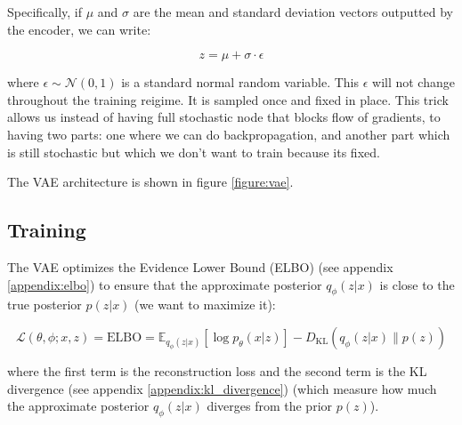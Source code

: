 Specifically, if $\mu$ and $\sigma$ are the mean and standard deviation vectors outputted by the encoder, we can write:

\begin{equation}
    z = \mu + \sigma \cdot \epsilon
\end{equation}

where $\epsilon \sim \mathcal{N}(0, 1)$ is a standard normal random variable. This $\epsilon$ will not change throughout the training reigime. It is sampled once and fixed in place. This trick allows us instead of having full stochastic node that blocks flow of gradients, to having two parts: one where we can do backpropagation, and another part which is still stochastic but which we don't want to train because its fixed.



The VAE architecture is shown in figure \ref{figure:vae}.

\subsection{Training}

The VAE optimizes the Evidence Lower Bound (ELBO) (see appendix \ref{appendix:elbo}) to ensure that the approximate posterior $q_\phi (z|x)$ is close to the true posterior $p(z|x)$ (we want to maximize it):

\begin{equation}
    \mathcal{L}(\theta, \phi; x, z) = \text{ELBO} = \mathbb{E}_{q_\phi(z|x)} \left[ \log p_\theta(x|z) \right] - D_\text{KL}(q_\phi(z|x) \| p(z))
    \label{eq:vae_elbo}
\end{equation}

where the first term is the reconstruction loss and the second term is the KL divergence (see appendix \ref{appendix:kl_divergence}) (which measure how much the approximate posterior $q_\phi (z|x)$ diverges from the prior $p(z)$). 